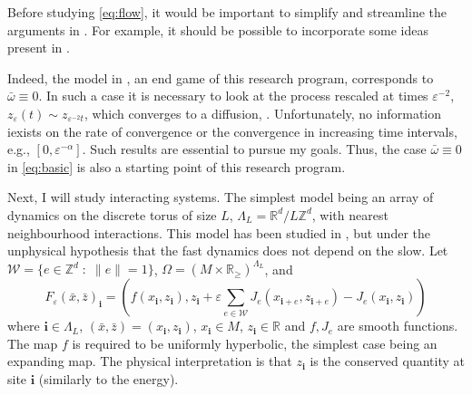 \documentclass[10pt, a4paper, reqno]{amsart}
\newcommand\cW{{\mathcal W}}
\newcommand\bR{{\mathbb R}}
\newcommand\bZ{{\mathbb Z}}
\newcommand\ve{\varepsilon}
\newcommand\bi{{\boldsymbol i}}
\begin{document}
Before studying \eqref{eq:flow}, it would be important to simplify and streamline the arguments in \cite{DL18}. For example, it should be possible to incorporate some ideas present in \cite{Bak1,Bak2}.

Indeed, the model in \cite{DL11b}, an end game of this research program, corresponds to $\bar\omega\equiv 0$. In such a case it is necessary to look at the process rescaled at times $\ve^{-2}$, $z_\ve(t)\sim z_{\ve^{-2} t}$, which converges to a diffusion, \cite{Do4b}. Unfortunately, no information iexists on the rate of convergence or the convergence in increasing time intervals, e.g., $[0,\ve^{-\alpha}]$. Such results are essential to pursue my goals. Thus, the case $\bar\omega\equiv 0$ in \eqref{eq:basic} is also a starting point of this research program.

Next, I will study interacting systems. The simplest model being an array of dynamics on the discrete torus of size $L$, $\Lambda_L=\bR^d/L\bZ^d$, with nearest neighbourhood interactions. This model has been studied in \cite{BK13b}, but under the unphysical hypothesis that the fast dynamics does not depend on the slow. Let $\cW=\{e\in\bZ^d\;:\; \|e\|=1\}$, $\Omega=(M\times \bR_{\geq})^{\Lambda_L}$, and
\begin{equation}\label{eq:BK}
F_\ve(\bar x,\bar z)_\bi=\left(f(x_\bi,z_\bi), z_\bi+\ve\sum_{e\in \cW}J_e(x_{\bi+e}, z_{\bi+e})-J_e(x_\bi,z_\bi)\right)
\end{equation}
where $\bi\in\Lambda_L$, $(\bar x,\bar z)=(x_\bi,z_\bi)$, $x_\bi\in M$, $z_\bi\in\bR$ and $f, J_e$ are smooth functions. The map $f$ is required to be uniformly hyperbolic, the simplest case being an expanding map. The physical interpretation is that $z_\bi$ is the conserved quantity at site $\bi$ (similarly to the energy).
\end{document}
